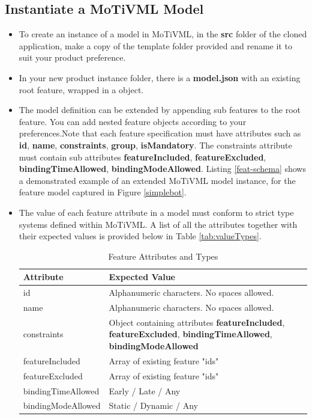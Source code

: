 \documentclass{article}
\begin{document}
\subsection{Instantiate a MoTiVML Model}
\begin{itemize}
	\item To create an instance of a model in MoTiVML, in the \textbf{src} folder of the cloned application, make a copy of the template folder provided and rename it to suit your product preference.
	
	\item In your new product instance folder, there is a \textbf{model.json} with an existing root feature, wrapped in a object.
	
	\item The model definition can be extended by appending sub features to the root feature. You can add nested feature objects according to your preferences.Note that each feature specification must have attributes such as \textbf{id}, \textbf{name}, \textbf{constraints}, \textbf{group}, \textbf{isMandatory}. The constraints attribute must contain sub attributes \textbf{featureIncluded}, \textbf{featureExcluded}, \textbf{bindingTimeAllowed}, \textbf{bindingModeAllowed}. Listing \ref{feat-schema} shows a demonstrated example of an extended MoTiVML model instance, for the feature model captured in Figure \ref{simplebot}.
	
	\item The value of each feature attribute in a model must conform to strict type systems defined within MoTiVML. A list of all the attributes together with their expected values is provided below in Table \ref{tab:valueTypes}.
	
	\begin{table}[H]
		\caption{Feature Attributes and Types}
			\begin{tabular}{|l|p{10cm}|}
				\hline
				Attribute & Expected Value \\\hline
				id & Alphanumeric characters. No spaces allowed.   \\ \hline
				name & Alphanumeric characters. No spaces allowed.   \\ \hline
				constraints & Object containing attributes \textbf{featureIncluded}, \textbf{featureExcluded}, \textbf{bindingTimeAllowed}, \textbf{bindingModeAllowed}  \\ \hline
				featureIncluded & Array of existing feature "ids" \\ \hline
				
				featureExcluded & Array of existing feature "ids" \\ \hline
				bindingTimeAllowed & Early / Late / Any \\ \hline
				bindingModeAllowed & Static / Dynamic / Any \\ \hline
				

\end{tabular}
\end{table}
\end{itemize}
\end{document}
